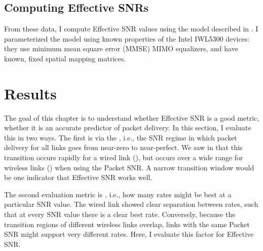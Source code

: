 \subsection{Computing Effective SNRs}
From these data, I compute Effective SNR values using the model described in . I parameterized the model using known properties of the Intel IWL5300 devices: they use minimum mean square error (MMSE) MIMO equalizers, and have known, fixed spatial mapping matrices.

\section{Results}
The goal of this chapter is to understand whether Effective SNR is a good metric, whether it is an accurate predictor of packet delivery. In this section, I evaluate this in two ways. The first is via the , i.e., the SNR regime in which packet delivery for all links goes from near-zero to near-perfect. We saw in  that this transition occurs rapidly for a wired link (), but occurs over a wide range for wireless links () when using the Packet SNR. A narrow transition window would be one indicator that Effective SNR works well.

The second evaluation metric is , i.e., how many rates might be best at a particular SNR value. The wired link showed clear separation between rates, such that at every SNR value there is a clear best rate. Conversely, because the transition regions of different wireless links overlap, links with the same Packet SNR might support very different rates. Here, I evaluate this factor for Effective SNR.

